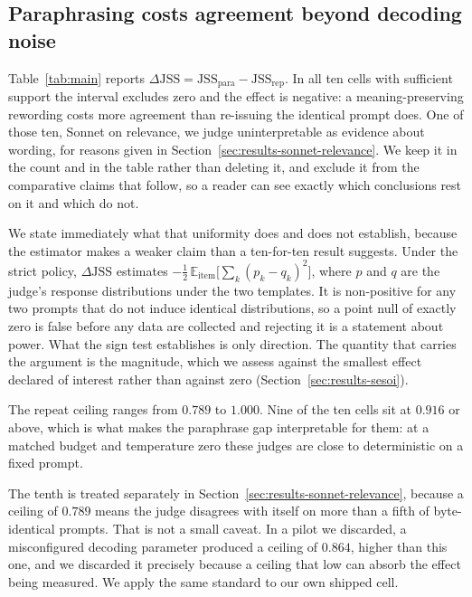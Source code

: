 \documentclass[11pt]{article}          %
\begin{document}
\subsection{Paraphrasing costs agreement beyond decoding noise}

Table~\ref{tab:main} reports $\Delta\mathrm{JSS} = \mathrm{JSS}_{\text{para}} -
\mathrm{JSS}_{\text{rep}}$. In all ten cells with sufficient support the interval
excludes zero and the effect is negative: a meaning-preserving rewording costs
more agreement than re-issuing the identical prompt does. One of those ten, Sonnet on relevance, we judge uninterpretable as evidence about
wording, for
reasons given in Section~\ref{sec:results-sonnet-relevance}. We keep it in the
count and in the table rather than deleting it, and exclude it from the
comparative claims that follow, so a reader can see exactly which conclusions
rest on it and which do not.

We state immediately what that uniformity does and does not establish, because
the estimator makes a weaker claim than a ten-for-ten result suggests. Under the
strict policy, $\Delta\mathrm{JSS}$ estimates
$-\tfrac{1}{2}\,\mathbb{E}_{\text{item}}\big[\sum_k (p_k - q_k)^2\big]$, where
$p$ and $q$ are the judge's response distributions under the two templates. It is
non-positive for any two prompts that do not induce identical distributions, so
a point null of exactly zero is false before any data are collected and rejecting
it is a statement about power. What the sign test establishes is only direction.
The quantity that carries the argument is the magnitude, which we assess against
the smallest effect declared of interest rather than against zero
(Section~\ref{sec:results-sesoi}).

The repeat ceiling ranges from $0.789$ to $1.000$. Nine of the ten cells sit at
$0.916$ or above, which is what makes the paraphrase gap interpretable for them:
at a matched budget and temperature zero these judges are close to deterministic
on a fixed prompt.

The tenth is treated separately in
Section~\ref{sec:results-sonnet-relevance}, because a ceiling of $0.789$ means
the judge disagrees with itself on more than a fifth of byte-identical prompts.
That is not a small caveat. In a pilot we discarded, a misconfigured decoding
parameter produced a ceiling of $0.864$, higher than this one, and we discarded
it precisely because a ceiling that low can absorb the effect being measured. We
apply the same standard to our own shipped cell.
\end{document}
